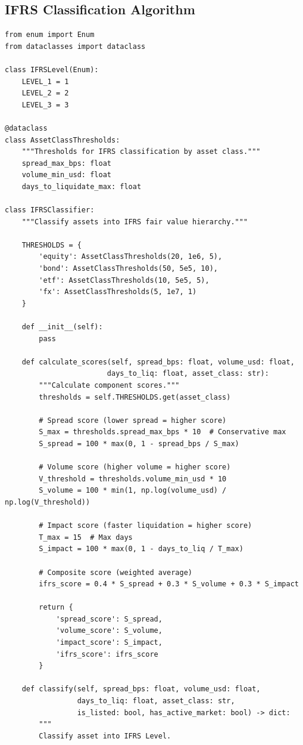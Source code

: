\documentclass[11pt,a4paper]{article}
\begin{document}
\subsection{IFRS Classification Algorithm}

\begin{lstlisting}[caption=IFRS Level Classification]
from enum import Enum
from dataclasses import dataclass

class IFRSLevel(Enum):
    LEVEL_1 = 1
    LEVEL_2 = 2
    LEVEL_3 = 3

@dataclass
class AssetClassThresholds:
    """Thresholds for IFRS classification by asset class."""
    spread_max_bps: float
    volume_min_usd: float
    days_to_liquidate_max: float

class IFRSClassifier:
    """Classify assets into IFRS fair value hierarchy."""

    THRESHOLDS = {
        'equity': AssetClassThresholds(20, 1e6, 5),
        'bond': AssetClassThresholds(50, 5e5, 10),
        'etf': AssetClassThresholds(10, 5e5, 5),
        'fx': AssetClassThresholds(5, 1e7, 1)
    }

    def __init__(self):
        pass

    def calculate_scores(self, spread_bps: float, volume_usd: float,
                        days_to_liq: float, asset_class: str):
        """Calculate component scores."""
        thresholds = self.THRESHOLDS.get(asset_class)

        # Spread score (lower spread = higher score)
        S_max = thresholds.spread_max_bps * 10  # Conservative max
        S_spread = 100 * max(0, 1 - spread_bps / S_max)

        # Volume score (higher volume = higher score)
        V_threshold = thresholds.volume_min_usd * 10
        S_volume = 100 * min(1, np.log(volume_usd) / np.log(V_threshold))

        # Impact score (faster liquidation = higher score)
        T_max = 15  # Max days
        S_impact = 100 * max(0, 1 - days_to_liq / T_max)

        # Composite score (weighted average)
        ifrs_score = 0.4 * S_spread + 0.3 * S_volume + 0.3 * S_impact

        return {
            'spread_score': S_spread,
            'volume_score': S_volume,
            'impact_score': S_impact,
            'ifrs_score': ifrs_score
        }

    def classify(self, spread_bps: float, volume_usd: float,
                 days_to_liq: float, asset_class: str,
                 is_listed: bool, has_active_market: bool) -> dict:
        """
        Classify asset into IFRS Level.


\end{lstlisting}
\end{document}
